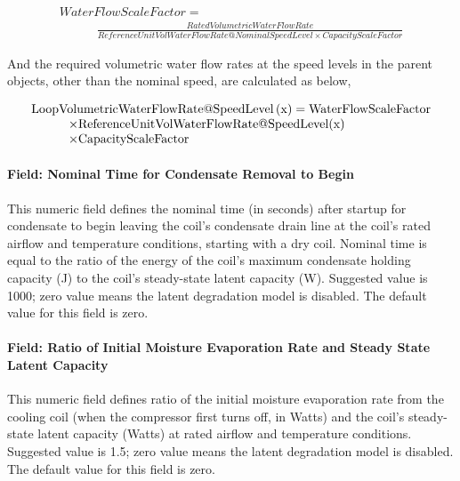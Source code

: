 \begin{equation}
  \begin{array}{l}
    WaterFlowScaleFactor = \\
    \quad \quad \quad \frac{{RatedVolumetricWaterFlowRate}}{{ReferenceUnitVolWaterFlowRate@NominalSpeedLevel \times CapacityScaleFactor}}
  \end{array}
\end{equation}

And the required volumetric water flow rates at the speed levels in the parent objects, other than the nominal speed, are calculated as below,

\begin{equation}
  \begin{array}{l}
    \rm{LoopVolumetricWaterFlowRate} @ \rm{SpeedLevel} \left( x \right) = \rm{WaterFlowScaleFactor} \\
    \quad \quad \quad \times \rm{ReferenceUnitVolWaterFlowRate} @ \rm{SpeedLevel}(x) \\
    \quad \quad \quad  \times \rm{CapacityScaleFactor}
  \end{array}
\end{equation}

\paragraph{Field: Nominal Time for Condensate Removal to Begin}\label{field-nominal-time-for-condensate-removal-to-begin-5}

This numeric field defines the nominal time (in seconds) after startup for condensate to begin leaving the coil's condensate drain line at the coil's rated airflow and temperature conditions, starting with a dry coil. Nominal time is equal to the ratio of the energy of the coil's maximum condensate holding capacity (J) to the coil's steady-state latent capacity (W). Suggested value is 1000; zero value means the latent degradation model is disabled. The default value for this field is zero.

\paragraph{Field: Ratio of Initial Moisture Evaporation Rate and Steady State Latent Capacity}\label{field-ratio-of-initial-moisture-evaporation-rate-and-steady-state-latent-capacity-5}

This numeric field defines ratio of the initial moisture evaporation rate from the cooling coil (when the compressor first turns off, in Watts) and the coil's steady-state latent capacity (Watts) at rated airflow and temperature conditions. Suggested value is 1.5; zero value means the latent degradation model is disabled. The default value for this field is zero.

